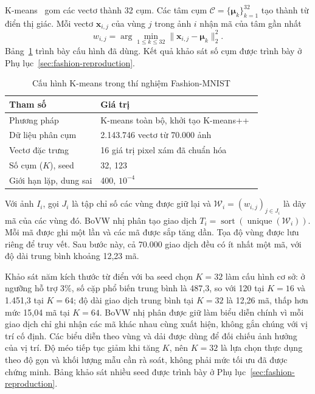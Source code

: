 K-means~\cite{lloyd} gom các vectơ thành 32 cụm. Các tâm cụm
$\mathcal{C}=\{\boldsymbol{\mu}_k\}_{k=1}^{32}$ tạo thành từ điển
thị giác. Mỗi vectơ $\mathbf{x}_{i,j}$ của vùng $j$ trong ảnh $i$
nhận mã của tâm gần nhất
\begin{equation}
 w_{i,j}=\arg\min_{1\leq k\leq32}
          \|\mathbf{x}_{i,j}-\boldsymbol{\mu}_k\|_2^2.
\end{equation}
Bảng~\ref{tab:kmeans_configuration} trình bày cấu hình đã dùng.
Kết quả khảo sát số cụm được trình bày ở Phụ lục~\ref{sec:fashion-reproduction}.

\begin{table}[!t]
    \centering
        \caption{Cấu hình K-means trong thí nghiệm Fashion-MNIST}
    \label{tab:kmeans_configuration}
    \footnotesize
    \setlength{\tabcolsep}{3pt}
    \begin{tabular}{@{}p{} p{}@{}}
        \hline
        \textbf{Tham số} & \textbf{Giá trị} \\
        \hline
        Phương pháp & K-means toàn bộ, khởi tạo K-means++~\cite{kmpp} \\
        Dữ liệu phân cụm & 2.143.746 vectơ từ 70.000 ảnh \\
        Vectơ đặc trưng & 16 giá trị pixel xám đã chuẩn hóa \\
        Số cụm ($K$), seed & 32, 123 \\
        Giới hạn lặp, dung sai & 400, $10^{-4}$ \\
        \hline
    \end{tabular}
\end{table}

Với ảnh $I_i$, gọi $J_i$ là tập chỉ số các vùng được giữ lại và
$\mathcal{W}_i=(w_{i,j})_{j\in J_i}$ là dãy mã của các vùng đó.
BoVW nhị phân tạo giao dịch
$T_i=\operatorname{sort}(\operatorname{unique}(\mathcal{W}_i))$.
Mỗi mã được ghi một lần và các mã được sắp tăng dần. Tọa độ vùng
được lưu riêng để truy vết. Sau bước này, cả 70.000 giao dịch đều
có ít nhất một mã, với độ dài trung bình khoảng 12,23 mã.

Khảo sát năm kích thước từ điển với ba seed chọn $K=32$ làm cấu hình
cơ sở: ở ngưỡng hỗ trợ 3\%, số cặp phổ biến trung bình là 487,3,
so với 120 tại $K=16$ và 1.451,3 tại $K=64$; độ dài giao dịch trung
bình tại $K=32$ là 12,26 mã, thấp hơn mức 15,04 mã tại $K=64$.
BoVW nhị phân được giữ làm biểu diễn chính vì mỗi giao dịch chỉ ghi
nhận các mã khác nhau cùng xuất hiện, không gắn chúng với vị trí cố
định. Các biểu diễn theo vùng và dải được dùng để đối chiếu ảnh hưởng
của vị trí. Độ méo tiếp tục giảm khi tăng $K$, nên $K=32$ là lựa chọn
thực dụng theo độ gọn và khối lượng mẫu cần rà soát, không phải mức
tối ưu đã được chứng minh. Bảng khảo sát nhiều seed được trình bày ở
Phụ lục~\ref{sec:fashion-reproduction}.


